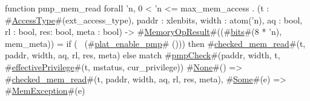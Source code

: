 function pmp_mem_read forall 'n, 0 < 'n <= max_mem_access . (t : #\hyperref[sailRISCVzAccessType]{AccessType}#(ext_access_type), paddr : xlenbits, width : atom('n), aq : bool, rl : bool, res: bool, meta : bool) -> #\hyperref[sailRISCVzMemoryOpResult]{MemoryOpResult}#((#\hyperref[sailRISCVzbits]{bits}#(8 * 'n), mem_meta)) =
  if   (~ (#\hyperref[sailRISCVzplatzyenablezypmp]{plat\_enable\_pmp}# ()))
  then #\hyperref[sailRISCVzcheckedzymemzyread]{checked\_mem\_read}#(t, paddr, width, aq, rl, res, meta)
  else {
    match #\hyperref[sailRISCVzpmpCheck]{pmpCheck}#(paddr, width, t, #\hyperref[sailRISCVzeffectivePrivilege]{effectivePrivilege}#(t, mstatus, cur_privilege)) {
      #\hyperref[sailRISCVzNone]{None}#()  => #\hyperref[sailRISCVzcheckedzymemzyread]{checked\_mem\_read}#(t, paddr, width, aq, rl, res, meta),
      #\hyperref[sailRISCVzSome]{Some}#(e) => #\hyperref[sailRISCVzMemException]{MemException}#(e)
    }
  }
